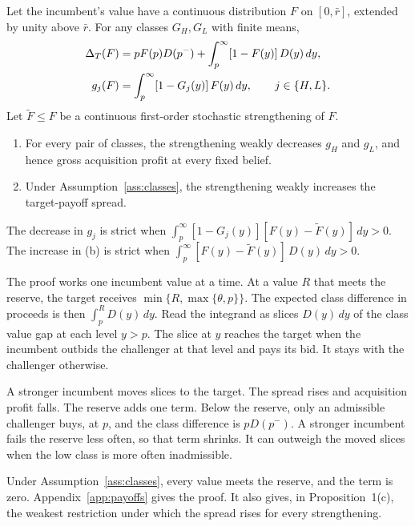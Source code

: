 \begin{proposition}\label{prop:returns}
Let the incumbent's value have a continuous distribution \(F\) on \([0,\bar r]\), extended by unity above
\(\bar r\). For any classes \(G_H,G_L\) with finite means,
\begin{equation}\label{eq:spread}
\begin{aligned}
\Delta_T(F)&=pF(p)D(p^-)+\int_p^\infty[1-F(y)]\,D(y)\,dy,\\
g_j(F)&=\int_p^\infty[1-G_j(y)]\,F(y)\,dy,\qquad j\in\{H,L\}.
\end{aligned}
\end{equation}
Let \(\tilde F\le F\) be a continuous first-order stochastic strengthening of \(F\).
\begin{enumerate}[label=(\alph*),leftmargin=2em]
\item For every pair of classes, the strengthening weakly decreases \(g_H\) and \(g_L\), and hence gross
acquisition profit at every fixed belief.
\item Under Assumption~\ref{ass:classes}, the strengthening weakly increases the target-payoff spread.
\end{enumerate}
The decrease in \(g_j\) is strict when \(\int_p^\infty[1-G_j(y)][F(y)-\tilde F(y)]\,dy>0\). The increase in
(b) is strict when \(\int_p^\infty[F(y)-\tilde F(y)]\,D(y)\,dy>0\).
\end{proposition}

The proof works one incumbent value at a time. At a value \(R\) that meets the reserve, the target receives
\(\min\{R,\max\{\theta,p\}\}\). The expected class difference in proceeds is then \(\int_p^RD(y)\,dy\). Read
the integrand as slices \(D(y)\,dy\) of the class value gap at each level \(y>p\). The slice at \(y\) reaches
the target when the incumbent outbids the challenger at that level and pays its bid. It stays with the
challenger otherwise.

A stronger incumbent moves slices to the target. The spread rises and acquisition profit falls. The reserve
adds one term. Below the reserve, only an admissible challenger buys, at \(p\), and the class difference is
\(pD(p^-)\). A stronger incumbent fails the reserve less often, so that term shrinks. It can outweigh the moved
slices when the low class is more often inadmissible.

Under Assumption~\ref{ass:classes}, every value meets the reserve, and the term is zero.
Appendix~\ref{app:payoffs} gives the proof. It also gives, in Proposition~1(c), the weakest restriction under
which the spread rises for every strengthening.


